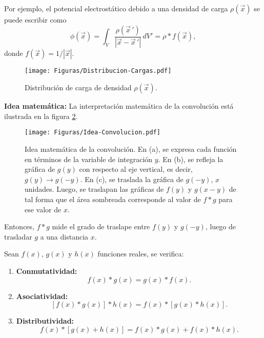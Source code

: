 Por ejemplo, el potencial electrostático debido a una densidad de carga $\rho(\Vec{x})$ se puede escribir como
$$\phi(\Vec{x}) = \int_{V} \frac{\rho(\Vec{x}\,')}{|\Vec{x} - \Vec{x}\,'|} \, dV' = \rho * f(\Vec{x}),$$
donde  $f(\Vec{x}) = 1/|\Vec{x}|$.

\begin{figure}[H]
    \centering
    \texttt{[image: Figuras/Distribucion-Cargas.pdf]}
    \caption{Distribución de carga de densidad $\rho(\Vec{x})$.}
    \label{fig:PotencialDistribucion}
\end{figure}

\textbf{Idea matemática:} La interpretación matemática de la convolución está ilustrada en la figura \ref{fig:IdeaConvolucion}.

\begin{figure}[H]
    \centering
    \texttt{[image: Figuras/Idea-Convolucion.pdf]}
    \caption{Idea matemática de la convolución. En (a), se expresa cada función en términos de la variable de integración $y$. En (b), se refleja la gráfica de $g(y)$ con respecto al eje vertical, es decir, $g(y) \rightarrow g(-y)$. En (c), se traslada la gráfica de $g(-y)$, $x$ unidades. Luego, se traslapan las gráficas de $f(y)$ y $g(x-y)$ de tal forma que el área sombreada corresponde al valor de $f * g$ para ese valor de $x$.}
    \label{fig:IdeaConvolucion}
\end{figure}

Entonces, $f * g$ mide el grado de traslape entre $f(y)$ y $g(-y)$, luego de trasladar $g$ a una distancia $x$.

\begin{propo}
Sean $f(x)$, $g(x)$ y $h(x)$  funciones reales, se verifica:

\begin{enumerate}
    \item \textbf{Conmutatividad:}$$f(x) * g(x) = g(x) * f(x).$$
    
    \item \textbf{Asociatividad:} $$[f(x)*g(x)]*h(x) = f(x)*[g(x)*h(x)].$$
    
    \item \textbf{Distributividad:} $$f(x)*[g(x)+h(x)] = f(x)*g(x) + f(x)*h(x).$$ 
\end{enumerate}
\end{propo}


